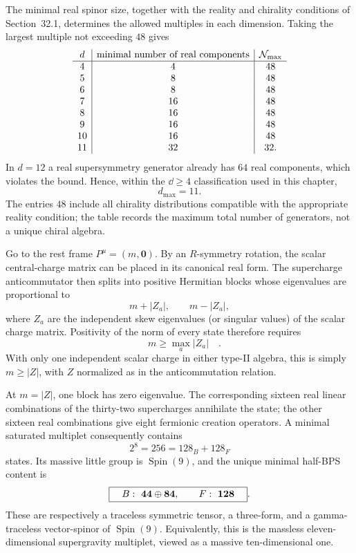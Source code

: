 \begin{enumerate}
  The minimal real spinor size, together with the reality and chirality
  conditions of Section~32.1, determines the allowed multiples in each
  dimension.  Taking the largest multiple not exceeding \(48\) gives
  \[
  \begin{array}{c|c|c}
    d&\text{minimal number of real components}&
       {\cal N}_{\max}\\ \hline
    4&4&48\\
    5&8&48\\
    6&8&48\\
    7&16&48\\
    8&16&48\\
    9&16&48\\
    10&16&48\\
    11&32&32 .
  \end{array}
  \]
  In \(d=12\) a real supersymmetry generator already has \(64\) real
  components, which violates the bound.  Hence, within the
  \(\dd\geq4\) classification used in this chapter,
  \[
    \boxed{d_{\max}=11}.
  \]
  The entries \(48\) include all chirality distributions compatible
  with the appropriate reality condition; the table records the
  maximum total number of generators, not a unique chiral algebra.

  Go to the rest frame \(P^\mu=(m,\boldsymbol0)\).  By an
  \(R\)-symmetry rotation, the scalar central-charge matrix can be
  placed in its canonical real form.  The supercharge
  anticommutator then splits into positive Hermitian blocks whose
  eigenvalues are proportional to
  \[
    m+|Z_a|,\qquad m-|Z_a|,
  \]
  where \(Z_a\) are the independent skew eigenvalues (or singular
  values) of the scalar charge matrix.  Positivity of the norm of
  every state therefore requires
  \[
    \boxed{\quad m\geq\max_a|Z_a|\quad}.
  \]
  With only one independent scalar charge in either type-II algebra,
  this is simply \(m\geq|Z|\), with \(Z\) normalized as in the
  anticommutation relation.

  At \(m=|Z|\), one block has zero eigenvalue.  The corresponding
  sixteen real linear combinations of the thirty-two supercharges
  annihilate the state; the other sixteen real combinations give
  eight fermionic creation operators.  A minimal saturated
  multiplet consequently contains
  \[
    2^8=256=128_B+128_F
  \]
  states.  Its massive little group is \(\operatorname{Spin}(9)\), and the unique
  minimal half-BPS content is
  \[
    \boxed{\quad
      B:\ {\bf44}\oplus{\bf84},\qquad
      F:\ {\bf128}\quad}.
  \]
  These are respectively a traceless symmetric tensor, a three-form,
  and a gamma-traceless vector-spinor of \(\operatorname{Spin}(9)\).
  Equivalently,
  this is the massless eleven-dimensional supergravity multiplet,
  viewed as a massive ten-dimensional one.


\end{enumerate}
